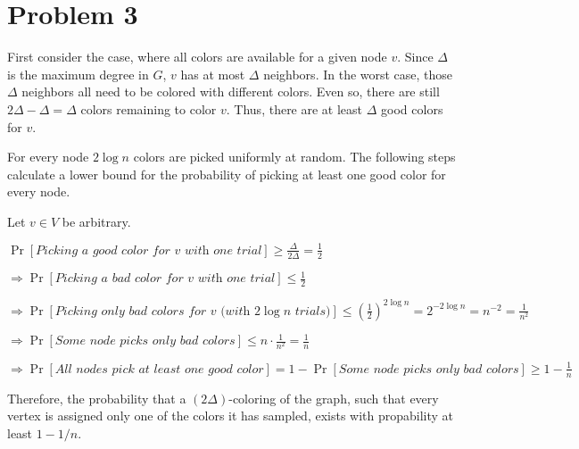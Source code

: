 \section*{Problem 3}

First consider the case, where all colors are available for a given node $v$. Since $\Delta$ is the maximum degree in $G$, $v$ has at most $\Delta$ neighbors. In the worst case, those $\Delta$ neighbors all need to be colored with different colors. Even so, there are still $2 \Delta - \Delta = \Delta$  colors remaining to color $v$. Thus, there are at least $\Delta$ good colors for $v$.

For every node $2 \log n$ colors are picked uniformly at random. The following steps calculate a lower bound for the probability of picking at least one good color for every node. 

Let $v \in V$ be arbitrary.

$\Pr[\textit{Picking a good color for v with one trial}] \geq \frac{\Delta}{2\Delta} = \frac{1}{2}$

$\Rightarrow \Pr[\textit{Picking a bad color for v with one trial}] \leq \frac{1}{2}$

$\Rightarrow \Pr[\textit{Picking only bad colors for v (with } 2\log n \textit{ trials)}] \leq 
\left(\frac{1}{2}\right)^{2 \log n} = 
2^{-2 \log n} = 
n^{-2} = 
\frac{1}{n^2}$

$\Rightarrow \Pr[\textit{Some node picks only bad colors}] \leq n \cdot \frac{1}{n^2} = \frac{1}{n}$

$\Rightarrow \Pr[\textit{All nodes pick at least one good color}] = 
1 - \Pr[\textit{Some node picks only bad colors}] \geq 1 - \frac{1}{n}$

Therefore, the probability that a $(2\Delta)$-coloring of the graph, such that every vertex is assigned only one of the colors it has sampled, exists with propability at least $1 - 1/n$.

\pagebreak